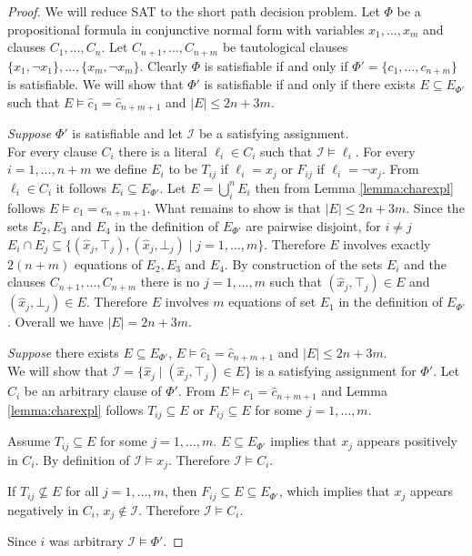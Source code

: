 \begin{proof}

We will reduce SAT to the short path decision problem.
Let $\Phi$ be a propositional formula in conjunctive normal form with variables $x_1,\ldots,x_m$ and clauses $C_1,\ldots,C_n$.
Let $C_{n+1},\ldots,C_{n+m}$ be tautological clauses $\{x_1, \neg x_1\},\ldots,\{x_m,\neg x_m\}$.
Clearly $\Phi$ is satisfiable if and only if $\Phi' = \{c_1,\ldots,c_{n+m}\}$ is satisfiable.
We will show that $\Phi'$ is satisfiable if and only if there exists $E \subseteq E_{\Phi'}$ such that $E \models \hat{c}_1 = \hat{c}_{n+m+1}$ and $|E| \leq 2n + 3m$.

\emph{Suppose} $\Phi'$ is satisfiable and let $\mathcal{I}$ be a satisfying assignment.\\
For every clause $C_i$ there is a literal $\ell_i \in C_i$ such that $\mathcal{I} \models \ell_i$.
For every $i = 1,\ldots,n+m$ we define $E_i$ to be $T_{ij}$ if $\ell_i = x_j$ or $F_{ij}$ if $\ell_i = \neg x_j$.
From $\ell_i \in C_i$ it follows $E_i \subseteq E_{\Phi'}$.
Let $E = \bigcup_i^n E_i$ then from Lemma \ref{lemma:charexpl} follows $E \models c_1 = c_{n+m+1}$.
What remains to show is that $|E| \leq 2n + 3m$.
Since the sets $E_2, E_3$ and $E_4$ in the definition of $E_{\Phi'}$ are pairwise disjoint, for $i \neq j$ $E_i \cap E_j \subseteq \{(\hat{x}_j,\top_j),(\hat{x}_j,\bot_j) \mid j = 1,\ldots,m\}$.
Therefore $E$ involves exactly $2(n+m)$ equations of $E_2, E_3$ and $E_4$.
By construction of the sets $E_i$ and the clauses $C_{n+1},\ldots,C_{n+m}$ there is no $j = 1,\ldots,m$ such that $(\hat{x}_j,\top_j) \in E$ and $(\hat{x}_j,\bot_j) \in E$.
Therefore $E$ involves $m$ equations of set $E_1$ in the definition of $E_{\Phi'}$.
Overall we have $|E| = 2n + 3m$.

\emph{Suppose} there exists $E \subseteq E_{\Phi'}$, $E \models \hat{c}_1 = \hat{c}_{n+m+1}$ and $|E| \leq 2n + 3m$.\\
We will show that $\mathcal{I} = \{\hat{x}_j \mid (\hat{x}_j,\top_j) \in E\}$ is a satisfying assignment for $\Phi'$.
Let $C_i$ be an arbitrary clause of $\Phi'$.
From $E \models \hat{c}_1 = \hat{c}_{n+m+1}$ and Lemma \ref{lemma:charexpl} follows $T_{ij} \subseteq E$ or $F_{ij} \subseteq E$ for some $j=1,\ldots,m$.

\noindent Assume $T_{ij} \subseteq E$ for some $j = 1,\ldots,m$.
$E \subseteq E_{\Phi'}$ implies that $x_j$ appears positively in $C_i$. 
By definition of $\mathcal{I} \models x_j$. Therefore $\mathcal{I} \models C_i$.

\noindent If $T_{ij} \nsubseteq E$ for all $j = 1,\ldots,m$, then $F_{ij} \subseteq E \subseteq E_{\Phi'}$, which implies that $x_j$ appears negatively in $C_i$, $x_j \notin \mathcal{I}$. Therefore $\mathcal{I} \models C_i$.

\noindent Since $i$ was arbitrary $\mathcal{I} \models \Phi'$.

\end{proof}